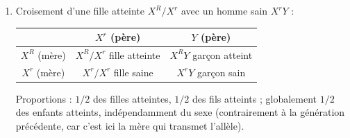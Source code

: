 \documentclass[11pt]{article}
\begin{document}
\begin{corrige}
\begin{enumerate}
\item Croisement d'une fille atteinte $X^{R}/X^{r}$ avec un homme sain $X^{r}Y$ :
\begin{center}
\begin{tabular}{|c|c|c|}\hline
\rowcolor{popblueL} & $X^{r}$ (père) & $Y$ (père) \\ \hline
$X^{R}$ (mère) & $X^{R}/X^{r}$ fille atteinte & $X^{R}Y$ garçon atteint \\ \hline
$X^{r}$ (mère) & $X^{r}/X^{r}$ fille saine & $X^{r}Y$ garçon sain \\ \hline
\end{tabular}
\end{center}
Proportions : $1/2$ des filles atteintes, $1/2$ des fils atteints ; globalement $1/2$ des enfants atteints, indépendamment du sexe (contrairement à la génération précédente, car c'est ici la mère qui transmet l'allèle).
\end{enumerate}
\end{corrige}
\end{document}

